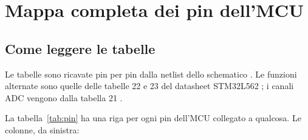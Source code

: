 \chapter{Mappa completa dei pin dell'MCU}
\label{ch:pin}

\section{Come leggere le tabelle}
Le tabelle sono ricavate pin per pin dalla netlist dello schematico . Le funzioni alternate sono quelle delle tabelle 22 e 23 del datasheet STM32L562 ; i canali ADC vengono dalla tabella 21 .

La tabella~\ref{tab:pin} ha una riga per ogni pin dell'MCU collegato a qualcosa. Le colonne, da sinistra:
